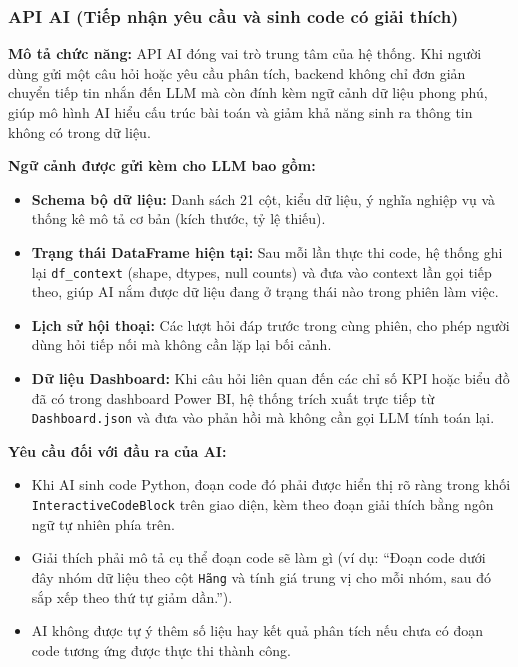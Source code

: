 \subsubsection{API AI (Tiếp nhận yêu cầu và sinh code có giải thích)}
\label{subsubsec:api_ai}

\noindent\textbf{Mô tả chức năng:}
API AI đóng vai trò trung tâm của hệ thống. Khi người dùng gửi một câu hỏi hoặc yêu cầu phân tích, backend không chỉ đơn giản chuyển tiếp tin nhắn đến LLM mà còn đính kèm ngữ cảnh dữ liệu phong phú, giúp mô hình AI hiểu cấu trúc bài toán và giảm khả năng sinh ra thông tin không có trong dữ liệu.

\noindent\textbf{Ngữ cảnh được gửi kèm cho LLM bao gồm:}
\begin{itemize}
    \item \textbf{Schema bộ dữ liệu:} Danh sách 21 cột, kiểu dữ liệu, ý nghĩa nghiệp vụ và thống kê mô tả cơ bản (kích thước, tỷ lệ thiếu).
    \item \textbf{Trạng thái DataFrame hiện tại:} Sau mỗi lần thực thi code, hệ thống ghi lại \texttt{df\_context} (shape, dtypes, null counts) và đưa vào context lần gọi tiếp theo, giúp AI nắm được dữ liệu đang ở trạng thái nào trong phiên làm việc.
    \item \textbf{Lịch sử hội thoại:} Các lượt hỏi đáp trước trong cùng phiên, cho phép người dùng hỏi tiếp nối mà không cần lặp lại bối cảnh.
    \item \textbf{Dữ liệu Dashboard:} Khi câu hỏi liên quan đến các chỉ số KPI hoặc biểu đồ đã có trong dashboard Power BI, hệ thống trích xuất trực tiếp từ \texttt{Dashboard.json} và đưa vào phản hồi mà không cần gọi LLM tính toán lại.
\end{itemize}

\noindent\textbf{Yêu cầu đối với đầu ra của AI:}
\begin{itemize}
    \item Khi AI sinh code Python, đoạn code đó phải được hiển thị rõ ràng trong khối \texttt{InteractiveCodeBlock} trên giao diện, kèm theo đoạn giải thích bằng ngôn ngữ tự nhiên phía trên.
    \item Giải thích phải mô tả cụ thể đoạn code sẽ làm gì (ví dụ: ``Đoạn code dưới đây nhóm dữ liệu theo cột \texttt{Hãng} và tính giá trung vị cho mỗi nhóm, sau đó sắp xếp theo thứ tự giảm dần.'').
    \item AI không được tự ý thêm số liệu hay kết quả phân tích nếu chưa có đoạn code tương ứng được thực thi thành công.
\end{itemize}

